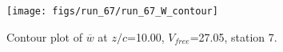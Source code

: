 \begin{figure}[H]
\centering
\texttt{[image: figs/run\_67/run\_67\_W\_contour]}
\caption{Contour plot of $\overline{w}$ at $z/c$=10.00, $V_{free}$=27.05, station 7.}
\label{fig:run_67_W_contour}
\end{figure}


